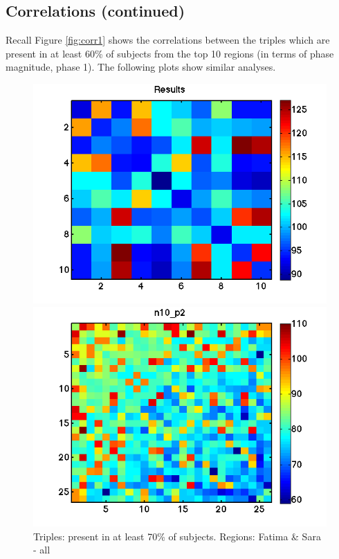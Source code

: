 \documentclass[11pt]{article}
\begin{document}
\subsection{Correlations (continued)}
Recall Figure \ref{fig:corr1} shows the correlations between the triples which are present in at least 60\% of subjects from the top 10 regions (in terms of phase magnitude, phase 1). The following plots show similar analyses.
\begin{figure}[h]
\begin{minipage}{.45\textwidth}
\includegraphics[width=\textwidth]{pictures/correlations_Results.png}
\vskip -10pt
\caption{Triples: present in at least 70\% of subjects. Regions: Fatima \& Sara - all}
\end{minipage}
\hfill
\begin{minipage}{.45\textwidth}
\vskip -10pt
\includegraphics[width=\textwidth]{pictures/correlations_n10_p2.png}

\end{minipage}
\end{figure}
\end{document}
